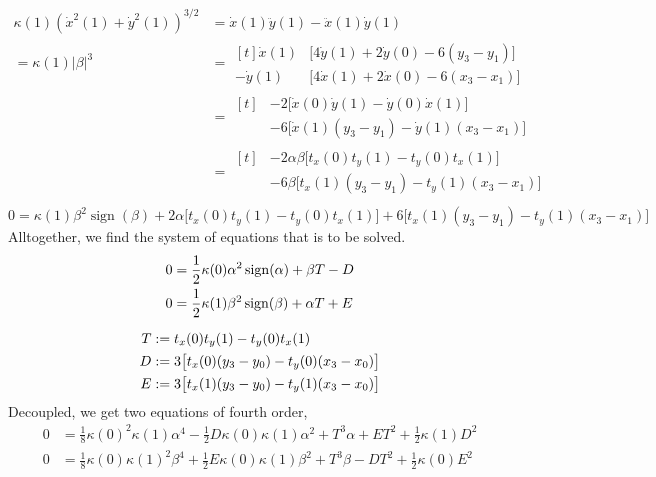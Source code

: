 \documentclass{article}
\newcommand{\sign}{\operatorname{sign}}
\begin{document}
\begin{align}
  \kappa(1) (\dot x^2(1) + \dot y^2(1))^{3/2}
  &= \dot x(1) \ddot y(1) - \ddot x(1) \dot y(1) \\
  = \kappa(1) |\beta|^3
  &= \begin{aligned}[t]
       \dot x(1) &\bigl[ 4\dot y(1) + 2\dot y(0) - 6(y_3-y_1)\bigr] \\
      -\dot y(1) &\bigl[ 4\dot x(1) + 2\dot x(0) - 6(x_3-x_1)\bigr]
     \end{aligned}\\
  &= \begin{aligned}[t]
       &-2 \bigl[\dot x(0) \dot y(1) - \dot y(0)\dot x(1)\bigr] \\
       &-6 \bigl[\dot x(1) (y_3-y_1) - \dot y(1) (x_3-x_1)\bigr]
     \end{aligned}\\
  &= \begin{aligned}[t]
       &-2 \alpha\beta \bigl[t_x(0)t_y(1) - t_y(0)t_x(1)\bigr] \\
       &-6 \beta \bigl[t_x(1) (y_3-y_1) - t_y(1) (x_3-x_1)\bigr]
     \end{aligned}\\
\end{align}
\begin{equation}
  0 = \kappa(1) \beta^2 \sign(\beta)
    + 2\alpha \bigl[t_x(0)t_y(1) - t_y(0)t_x(1)\bigr]
    + 6 \bigl[t_x(1) (y_3-y_1) - t_y(1) (x_3-x_1)\bigr]
\end{equation}
%
Alltogether, we find the system of equations that is to be solved.
%
\begin{gather}
  \begin{aligned}
    0 &= \frac{1}{2} \kappa(0) \alpha^2 \sign(\alpha) + \beta T - D \\
    0 &= \frac{1}{2} \kappa(1) \beta^2 \sign(\beta) + \alpha T + E
  \end{aligned}\\[\medskipamount]
  \begin{aligned}
    T &:= t_x(0)t_y(1) - t_y(0)t_x(1) \\
    D &:= 3 \bigl[t_x(0) (y_3-y_0) - t_y(0) (x_3-x_0)\bigr]\\
    E &:= 3 \bigl[t_x(1) (y_3-y_0) - t_y(1) (x_3-x_0)\bigr]
  \end{aligned}
\end{gather}
%
Decoupled, we get two equations of fourth order,
%
\begin{align}
  0 &= \frac{1}{8} \kappa(0)^2\kappa(1) \alpha^4
     - \frac{1}{2}D\kappa(0)\kappa(1)\alpha^2
     + T^3 \alpha
     + E T^2 + \frac{1}{2}\kappa(1) D^2 \\
   0 &= \frac{1}{8} \kappa(0)\kappa(1)^2\beta^4
     + \frac{1}{2}E\kappa(0)\kappa(1)\beta^2
     + T^3 \beta
     - D T^2 + \frac{1}{2}\kappa(0) E^2 \\
\end{align}
%
\end{document}
